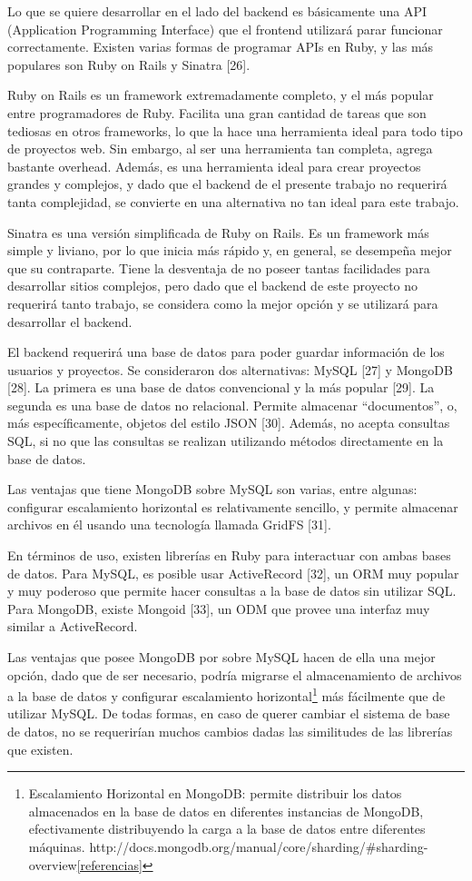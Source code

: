 \documentclass[12pt,spanish,letter]{report}
\begin{document}
Lo que se quiere desarrollar en el lado del backend es básicamente una
API (Application Programming Interface) que el frontend utilizará parar
funcionar correctamente. Existen varias formas de programar APIs en
Ruby, y las más populares son Ruby on Rails y Sinatra {[}26{]}.

Ruby on Rails es un framework extremadamente completo, y el más popular
entre programadores de Ruby. Facilita una gran cantidad de tareas que
son tediosas en otros frameworks, lo que la hace una herramienta ideal
para todo tipo de proyectos web. Sin embargo, al ser una herramienta tan
completa, agrega bastante overhead. Además, es una herramienta ideal
para crear proyectos grandes y complejos, y dado que el backend de el
presente trabajo no requerirá tanta complejidad, se convierte en una
alternativa no tan ideal para este trabajo.

Sinatra es una versión simplificada de Ruby on Rails. Es un framework
más simple y liviano, por lo que inicia más rápido y, en general, se
desempeña mejor que su contraparte. Tiene la desventaja de no poseer
tantas facilidades para desarrollar sitios complejos, pero dado que el
backend de este proyecto no requerirá tanto trabajo, se considera como
la mejor opción y se utilizará para desarrollar el backend.

El backend requerirá una base de datos para poder guardar información de
los usuarios y proyectos. Se consideraron dos alternativas: MySQL
{[}27{]} y MongoDB {[}28{]}. La primera es una base de datos
convencional y la más popular {[}29{]}. La segunda es una base de datos
no relacional. Permite almacenar ``documentos'', o, más específicamente,
objetos del estilo JSON {[}30{]}. Además, no acepta consultas SQL, si no
que las consultas se realizan utilizando métodos directamente en la base
de datos.

Las ventajas que tiene MongoDB sobre MySQL son varias, entre algunas:
configurar escalamiento horizontal es relativamente sencillo, y permite
almacenar archivos en él usando una tecnología llamada GridFS {[}31{]}.

En términos de uso, existen librerías en Ruby para interactuar con ambas
bases de datos. Para MySQL, es posible usar ActiveRecord {[}32{]}, un
ORM muy popular y muy poderoso que
permite hacer consultas a la base de datos sin utilizar SQL. Para
MongoDB, existe Mongoid {[}33{]}, un ODM que provee una
interfaz muy similar a ActiveRecord.

Las ventajas que posee MongoDB por sobre MySQL hacen de ella una mejor
opción, dado que de ser necesario, podría migrarse el almacenamiento de
archivos a la base de datos y configurar escalamiento
horizontal\footnote{Escalamiento Horizontal en MongoDB: permite
  distribuir los datos almacenados en la base de datos en diferentes
  instancias de MongoDB, efectivamente distribuyendo la carga a la base
  de datos entre diferentes máquinas.
  http://docs.mongodb.org/manual/core/sharding/\#sharding-overview\ref{referencias}}
más fácilmente que de utilizar MySQL. De todas formas, en caso de querer
cambiar el sistema de base de datos, no se requerirían muchos cambios
dadas las similitudes de las librerías que existen.
\end{document}
